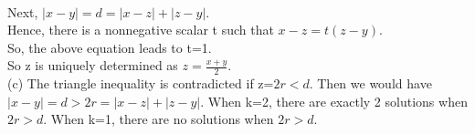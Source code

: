 \\Next, $|x-y|=d=|x-z|+|z-y|.$ \\ 
Hence, there is a nonnegative scalar t such that $x-z =t(z-y).$ \\ 
So, the above equation leads to t=1. \\ 
So z is uniquely determined as $z= \frac{x+y}{2}.$ \\ 
(c) The triangle inequality is contradicted if z=$2r<d$. Then we would have $|x-y|=d>2r =|x-z|+|z-y|.$ When k=2, there are exactly 2 solutions when $2r>d$. When k=1, there are no solutions when $2r>d$. \\ 

\begin{figure}[ht]\end{figure} 
\newpage
